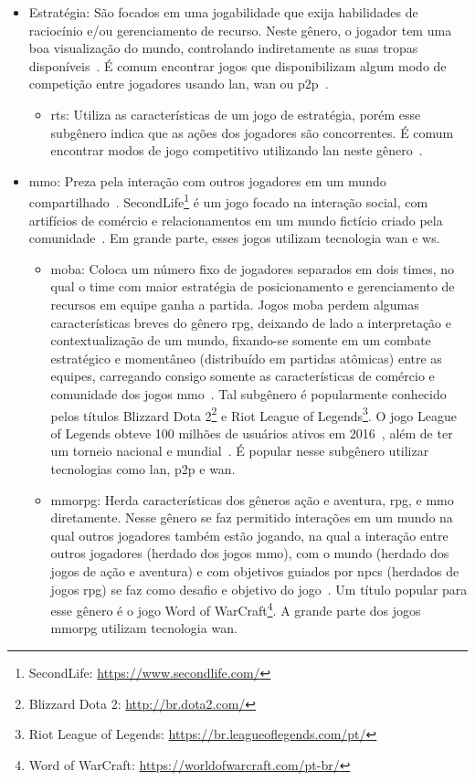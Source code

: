 \begin{itemize}
  \item Estratégia: São focados em uma jogabilidade que exija habilidades de raciocínio e/ou gerenciamento de recurso. Neste gênero, o jogador tem uma boa visualização do mundo, controlando indiretamente as suas tropas disponíveis~\cite{rollings2003andrew}. É comum encontrar jogos que disponibilizam algum modo de competição entre jogadores usando \ac{lan}, \ac{wan} ou \ac{p2p}~\cite{adams_1208533}.
    \begin{itemize}
      \item \ac{rts}: Utiliza as características de um jogo de estratégia, porém esse subgênero indica que as ações dos jogadores são concorrentes. É comum encontrar modos de jogo competitivo utilizando \ac{lan} neste gênero~\cite{adams_1208533}.
    \end{itemize}
  \item \ac{mmo}: Preza pela interação com outros jogadores em um mundo compartilhado~\cite{adams_1208533}. SecondLife\footnote{SecondLife: \url{https://www.secondlife.com/}} é um jogo focado na interação social, com artifícios de comércio e relacionamentos em um mundo fictício criado pela comunidade~\cite{tecmundo_secondlife}. Em grande parte, esses jogos utilizam tecnologia \ac{wan} e \ac{ws}.
    \begin{itemize}
      \item \ac{moba}: Coloca um número fixo de jogadores separados em dois times, no qual o time com maior estratégia de posicionamento e gerenciamento de recursos em equipe ganha a partida. Jogos \ac{moba} perdem algumas características breves do gênero \ac{rpg}, deixando de lado a interpretação e contextualização de um mundo, fixando-se somente em um combate estratégico e momentâneo (distribuído em partidas atômicas) entre as equipes, carregando consigo somente as características de comércio e comunidade dos jogos \ac{mmo}~\cite{adams_1208533}. Tal subgênero é popularmente conhecido pelos títulos Blizzard Dota 2\footnote{Blizzard Dota 2: \url{http://br.dota2.com/}} e Riot League of Legends\footnote{Riot League of Legends: \url{https://br.leagueoflegends.com/pt/}}. O jogo League of Legends obteve 100 milhões de usuários ativos em 2016~\cite{lol_statista}, além de ter um torneio nacional e mundial~\cite{lol_sportv}. É popular nesse subgênero utilizar tecnologias como \ac{lan}, \ac{p2p} e \ac{wan}.
      \item \ac{mmorpg}: Herda características dos gêneros ação e aventura, \ac{rpg}, e \ac{mmo} diretamente. Nesse gênero se faz permitido interações em um mundo na qual outros jogadores também estão jogando, na qual a interação entre outros jogadores (herdado dos jogos \ac{mmo}), com o mundo (herdado dos jogos de ação e aventura) e com objetivos guiados por \ac{npcs} (herdados de jogos \ac{rpg}) se faz como desafio e objetivo do jogo~\cite{adams_1208533}. Um título popular para esse gênero é o jogo Word of WarCraft\footnote{Word of WarCraft: \url{https://worldofwarcraft.com/pt-br/}}. A grande parte dos jogos \ac{mmorpg} utilizam tecnologia \ac{wan}.

\end{itemize}
\end{itemize}
